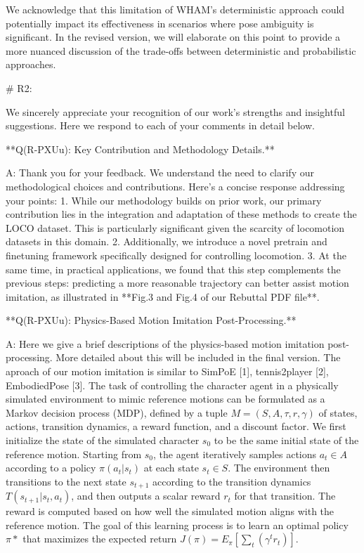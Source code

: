 We acknowledge that this limitation of WHAM's deterministic approach could potentially impact its effectiveness in scenarios where pose ambiguity is significant. In the revised version, we will elaborate on this point to provide a more nuanced discussion of the trade-offs between deterministic and probabilistic approaches.




# R2:


We sincerely appreciate your recognition of our work's strengths and insightful suggestions. Here we respond to each of your comments in detail below.


**Q(R-PXUu): Key Contribution and Methodology Details.**

A: Thank you for your feedback. We understand the need to clarify our methodological choices and contributions. Here's a concise response addressing your points:
1. While our methodology builds on prior work, our primary contribution lies in the integration and adaptation of these methods to create the LOCO dataset. This is particularly significant given the scarcity of locomotion datasets in this domain. 
2. Additionally, we introduce a novel pretrain and finetuning framework specifically designed for controlling locomotion. 
3. At the same time, in practical applications, we found that this step complements the previous steps: predicting a more reasonable trajectory can better assist motion imitation, as illustrated in **Fig.3 and Fig.4 of our Rebuttal PDF file**.




**Q(R-PXUu): Physics-Based Motion Imitation Post-Processing.**

A: Here we give a brief descriptions of the physics-based motion imitation post-processing. More detailed about this will be included in the final version. The aproach of our motion imitation is similar to SimPoE [1], tennis2player [2], EmbodiedPose [3]. The task of controlling the character agent in a physically simulated environment to mimic reference motions can be formulated as a Markov decision process (MDP), defined by a tuple $M=(S,A,\tau,r,\gamma)$ of states, actions, transition dynamics, a reward function, and a discount factor. We first initialize the state of the simulated character $s_0$ to be the same initial state of the reference motion. Starting from $s_0$, the agent iteratively samples actions $a_t \in A$ according to a policy $\pi(a_t | s_t)$ at each state $s_t \in S$. The environment then transitions to the next state $s_{t+1}$ according to the transition dynamics $T(s_{t+1} | s_t, a_t)$, and then outputs a scalar reward $r_t$ for that transition. The reward is computed based on how well the simulated motion aligns with the reference motion. The goal of this learning process is to learn an optimal policy $\pi*$ that maximizes the expected return $J(\pi) = E_\pi[\sum_t(\gamma^tr_t)]$. 

